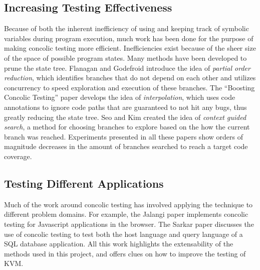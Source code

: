 \documentclass[11pt]{article}
\begin{document}
\subsection{Increasing Testing Effectiveness}
Because of both the inherent inefficiency of using and keeping track of symbolic
variables during program execution, much work has been done for the purpose of
making concolic testing more efficient. Inefficiencies exist because of the
sheer size of the space of possible program states. Many methods have been
developed to prune the state tree. Flanagan and Godefroid introduce the idea
of \textit{partial order reduction}, which identifies branches that do not
depend on each other and utilizes concurrency to speed exploration and execution
of these branches. The ``Boosting Concolic Testing'' paper develops the idea
of \textit{interpolation}, which uses code annotations to ignore code paths that
are guaranteed to not hit any bugs, thus greatly reducing the state tree. Seo
and Kim created the idea of \textit{context guided search}, a method for
choosing branches to explore based on the how the current branch was
reached. Experiments presented in all these papers show orders of magnitude
decreases in the amount of branches searched to reach a target code coverage. 

\subsection{Testing Different Applications}
Much of the work around concolic testing has involved applying the technique to
different problem domains. For example, the Jalangi paper implements concolic testing for
Javascript applications in the browser. The Sarkar paper discusses the use of
concolic testing to test both the host language and query language of a SQL
database application. All this work highlights the extensability of the methods
used in this project, and offers clues on how to improve the testing of KVM.

\end{document}
